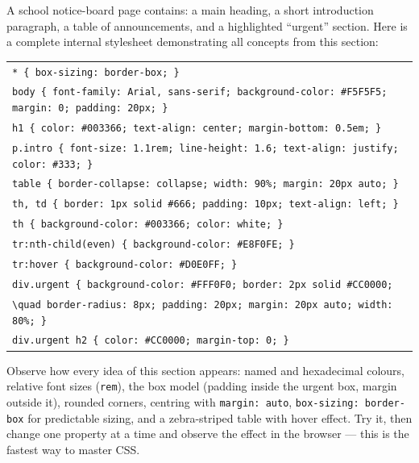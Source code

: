 \documentclass[11pt]{article}
\begin{document}
\begin{experience}
A school notice-board page contains: a main heading, a short introduction paragraph, a table of announcements, and a highlighted ``urgent'' section. Here is a complete internal stylesheet demonstrating all concepts from this section:
\begin{center}
\begin{tabular}{l}
\texttt{* \{ box-sizing: border-box; \}} \\
\texttt{body \{ font-family: Arial, sans-serif; background-color: \#F5F5F5; margin: 0; padding: 20px; \}} \\
\texttt{h1 \{ color: \#003366; text-align: center; margin-bottom: 0.5em; \}} \\
\texttt{p.intro \{ font-size: 1.1rem; line-height: 1.6; text-align: justify; color: \#333; \}} \\
\texttt{table \{ border-collapse: collapse; width: 90\%; margin: 20px auto; \}} \\
\texttt{th, td \{ border: 1px solid \#666; padding: 10px; text-align: left; \}} \\
\texttt{th \{ background-color: \#003366; color: white; \}} \\
\texttt{tr:nth-child(even) \{ background-color: \#E8F0FE; \}} \\
\texttt{tr:hover \{ background-color: \#D0E0FF; \}} \\
\texttt{div.urgent \{ background-color: \#FFF0F0; border: 2px solid \#CC0000; } \\
\texttt{\textbackslash{}quad border-radius: 8px; padding: 20px; margin: 20px auto; width: 80\%; \}} \\
\texttt{div.urgent h2 \{ color: \#CC0000; margin-top: 0; \}} \\
\end{tabular}
\end{center}
Observe how every idea of this section appears: named and hexadecimal colours, relative font sizes (\texttt{rem}), the box model (padding inside the urgent box, margin outside it), rounded corners, centring with \texttt{margin: auto}, \texttt{box-sizing: border-box} for predictable sizing, and a zebra-striped table with hover effect. Try it, then change one property at a time and observe the effect in the browser --- this is the fastest way to master CSS.
\end{experience}
\end{document}
